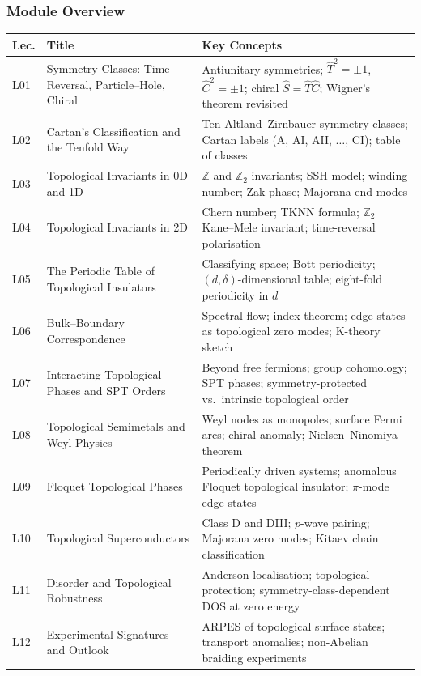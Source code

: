 \documentclass[11pt,a4paper]{article}
\begin{document}
\subsubsection*{Module Overview}
{\footnotesize
\begin{center}
\begin{tabular}{@{}lp{4.2cm}p{6.8cm}@{}}
\toprule
\textbf{Lec.} & \textbf{Title} & \textbf{Key Concepts}\\
\midrule
L01 & Symmetry Classes: Time-Reversal, Particle--Hole, Chiral & Antiunitary symmetries; $\hat{T}^2=\pm1$, $\hat{C}^2=\pm1$; chiral $\hat{S}=\hat{T}\hat{C}$; Wigner's theorem revisited\\
L02 & Cartan's Classification and the Tenfold Way & Ten Altland--Zirnbauer symmetry classes; Cartan labels (A, AI, AII, $\ldots$, CI); table of classes\\
L03 & Topological Invariants in 0D and 1D & $\mathbb{Z}$ and $\mathbb{Z}_2$ invariants; SSH model; winding number; Zak phase; Majorana end modes\\
L04 & Topological Invariants in 2D & Chern number; TKNN formula; $\mathbb{Z}_2$ Kane--Mele invariant; time-reversal polarisation\\
\midrule
L05 & The Periodic Table of Topological Insulators & Classifying space; Bott periodicity; $(d,\delta)$-dimensional table; eight-fold periodicity in $d$\\
L06 & Bulk--Boundary Correspondence & Spectral flow; index theorem; edge states as topological zero modes; K-theory sketch\\
L07 & Interacting Topological Phases and SPT Orders & Beyond free fermions; group cohomology; SPT phases; symmetry-protected vs.\ intrinsic topological order\\
L08 & Topological Semimetals and Weyl Physics & Weyl nodes as monopoles; surface Fermi arcs; chiral anomaly; Nielsen--Ninomiya theorem\\
\midrule
L09 & Floquet Topological Phases & Periodically driven systems; anomalous Floquet topological insulator; $\pi$-mode edge states\\
L10 & Topological Superconductors & Class D and DIII; $p$-wave pairing; Majorana zero modes; Kitaev chain classification\\
L11 & Disorder and Topological Robustness & Anderson localisation; topological protection; symmetry-class-dependent DOS at zero energy\\
L12 & Experimental Signatures and Outlook & ARPES of topological surface states; transport anomalies; non-Abelian braiding experiments\\
\bottomrule
\end{tabular}
\end{center}
}
\end{document}
